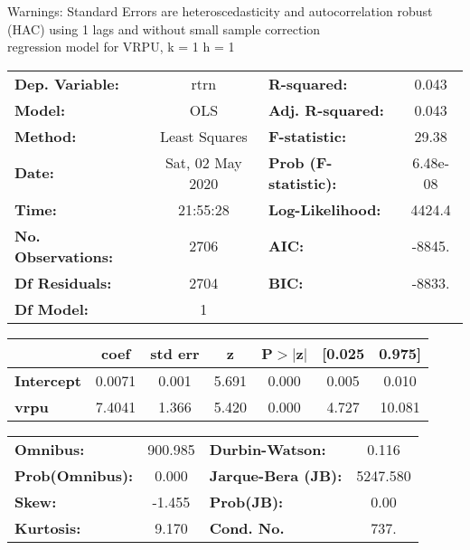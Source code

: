 Warnings: \newline
 [1] Standard Errors are heteroscedasticity and autocorrelation robust (HAC) using 1 lags and without small sample correction\\ 

regression model for VRPU, k = 1 h = 1\begin{center}
\begin{tabular}{lclc}
\toprule
\textbf{Dep. Variable:}    &       rtrn       & \textbf{  R-squared:         } &     0.043   \\
\textbf{Model:}            &       OLS        & \textbf{  Adj. R-squared:    } &     0.043   \\
\textbf{Method:}           &  Least Squares   & \textbf{  F-statistic:       } &     29.38   \\
\textbf{Date:}             & Sat, 02 May 2020 & \textbf{  Prob (F-statistic):} &  6.48e-08   \\
\textbf{Time:}             &     21:55:28     & \textbf{  Log-Likelihood:    } &    4424.4   \\
\textbf{No. Observations:} &        2706      & \textbf{  AIC:               } &    -8845.   \\
\textbf{Df Residuals:}     &        2704      & \textbf{  BIC:               } &    -8833.   \\
\textbf{Df Model:}         &           1      & \textbf{                     } &             \\
\bottomrule
\end{tabular}
\begin{tabular}{lcccccc}
                   & \textbf{coef} & \textbf{std err} & \textbf{z} & \textbf{P$> |$z$|$} & \textbf{[0.025} & \textbf{0.975]}  \\
\midrule
\textbf{Intercept} &       0.0071  &        0.001     &     5.691  &         0.000        &        0.005    &        0.010     \\
\textbf{vrpu}      &       7.4041  &        1.366     &     5.420  &         0.000        &        4.727    &       10.081     \\
\bottomrule
\end{tabular}
\begin{tabular}{lclc}
\textbf{Omnibus:}       & 900.985 & \textbf{  Durbin-Watson:     } &    0.116  \\
\textbf{Prob(Omnibus):} &   0.000 & \textbf{  Jarque-Bera (JB):  } & 5247.580  \\
\textbf{Skew:}          &  -1.455 & \textbf{  Prob(JB):          } &     0.00  \\
\textbf{Kurtosis:}      &   9.170 & \textbf{  Cond. No.          } &     737.  \\
\bottomrule
\end{tabular}
\end{center}

